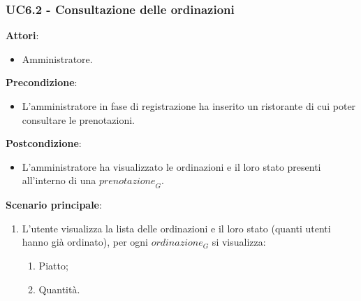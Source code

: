\subsubsection{UC6.2 - Consultazione delle ordinazioni}\label{usecase:6_2}
\textbf{Attori}:
\begin{itemize}
    \item Amministratore.
\end{itemize}
\textbf{Precondizione}:
\begin{itemize}
    \item L'amministratore in fase di registrazione ha inserito un ristorante di cui poter consultare le prenotazioni.
\end{itemize}
\textbf{Postcondizione}:
\begin{itemize}
    \item L'amministratore ha visualizzato le ordinazioni e il loro stato presenti all'interno di una $\textit{prenotazione}_G$.
\end{itemize}
\textbf{Scenario principale}:
\begin{enumerate}
    \item L'utente visualizza la lista delle ordinazioni e il loro stato (quanti utenti hanno già ordinato), per ogni $\textit{ordinazione}_G$ si visualizza:
    \begin{enumerate}
        \item Piatto;
        \item Quantità.
    \end{enumerate}
\end{enumerate}
\newpage